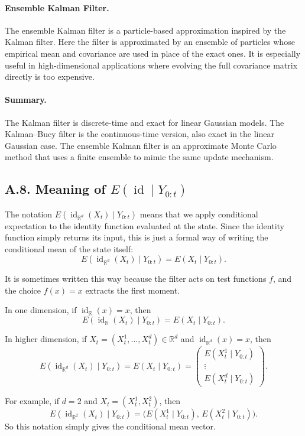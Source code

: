 \documentclass[11pt]{article}
\theoremstyle{definition}
\theoremstyle{remark}
\begin{document}
\paragraph{Ensemble Kalman Filter.}
The ensemble Kalman filter is a particle-based approximation inspired by the Kalman filter. Here the filter is approximated by an ensemble of particles whose empirical mean and covariance are used in place of the exact ones. It is especially useful in high-dimensional applications where evolving the full covariance matrix directly is too expensive.

\paragraph{Summary.}
The Kalman filter is discrete-time and exact for linear Gaussian models. The Kalman--Bucy filter is the continuous-time version, also exact in the linear Gaussian case. The ensemble Kalman filter is an approximate Monte Carlo method that uses a finite ensemble to mimic the same update mechanism.

\subsection*{A.8. Meaning of $E(\operatorname{id}\mid Y_{0:t})$}
The notation $E(\operatorname{id}_{\mathbb R^d}(X_t)\mid Y_{0:t})$ means that we apply conditional expectation to the identity function evaluated at the state. Since the identity function simply returns its input, this is just a formal way of writing the conditional mean of the state itself:
\[
E(\operatorname{id}_{\mathbb R^d}(X_t)\mid Y_{0:t})=E(X_t\mid Y_{0:t}).
\]

It is sometimes written this way because the filter acts on test functions $f$, and the choice $f(x)=x$ extracts the first moment.

In one dimension, if $\operatorname{id}_{\mathbb R}(x)=x$, then
\[
E(\operatorname{id}_{\mathbb R}(X_t)\mid Y_{0:t})=E(X_t\mid Y_{0:t}).
\]

In higher dimension, if $X_t=(X_t^1,\dots,X_t^d)\in\mathbb R^d$ and $\operatorname{id}_{\mathbb R^d}(x)=x$, then
\[
E(\operatorname{id}_{\mathbb R^d}(X_t)\mid Y_{0:t})
=
E(X_t\mid Y_{0:t})
=
\begin{pmatrix}
E(X_t^1\mid Y_{0:t})\\
\vdots\\
E(X_t^d\mid Y_{0:t})
\end{pmatrix}.
\]

For example, if $d=2$ and $X_t=(X_t^1,X_t^2)$, then
\[
E(\operatorname{id}_{\mathbb R^2}(X_t)\mid Y_{0:t})
=
\bigl(E(X_t^1\mid Y_{0:t}),\,E(X_t^2\mid Y_{0:t})\bigr).
\]
So this notation simply gives the conditional mean vector.
\end{document}
